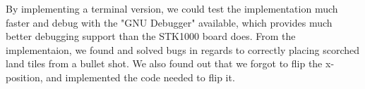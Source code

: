 

By implementing a terminal version, we could test the implementation
much faster and debug with the "GNU Debugger" available, which provides 
much better debugging support than the STK1000 board does. From the
implementaion, we found and solved bugs in regards to correctly placing
scorched land tiles from a bullet shot. We also found out that we forgot to
flip the x-position, and implemented the code needed to flip it.

